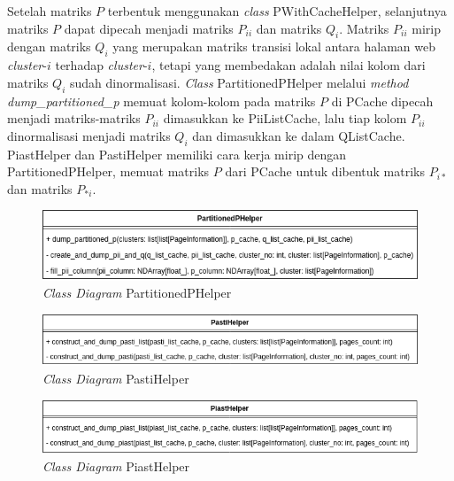 Setelah matriks $P$ terbentuk menggunakan \textit{class} PWithCacheHelper, selanjutnya matriks $P$ dapat dipecah menjadi matriks $P_{ii}$ dan matriks $Q_i$. Matriks $P_{ii}$ mirip dengan matriks $Q_i$ yang merupakan matriks transisi lokal antara halaman web \textit{cluster}-$i$ terhadap \textit{cluster}-$i$, tetapi yang membedakan adalah nilai kolom dari matriks $Q_i$ sudah dinormalisasi. \textit{Class} PartitionedPHelper melalui \textit{method} \textit{dump\_partitioned\_p} memuat kolom-kolom pada matriks $P$ di PCache dipecah menjadi matriks-matriks $P_{ii}$ dimasukkan ke PiiListCache, lalu tiap kolom $P_{ii}$ dinormalisasi menjadi matriks $Q_i$ dan dimasukkan ke dalam QListCache. PiastHelper dan PastiHelper memiliki cara kerja mirip dengan PartitionedPHelper, memuat matriks $P$ dari PCache untuk dibentuk matriks $P_{i*}$ dan matriks $P_{*i}$. 

\begin{figure}[H]
  \centering
  \includegraphics[keepaspectratio, width={\textwidth}]{gambar/partitioned_p_helper_class_diagram}
  \caption{\textit{Class Diagram} PartitionedPHelper}
	\label{gambar:partitioned_p_helper_class_diagram}
\end{figure}

\begin{figure}[H]
  \centering
  \includegraphics[keepaspectratio, width={\textwidth}]{gambar/pasti_helper_class_diagram}
  \caption{\textit{Class Diagram} PastiHelper}
	\label{gambar:pasti_helper_class_diagram}
\end{figure}

\begin{figure}[H]
  \centering
  \includegraphics[keepaspectratio, width={\textwidth}]{gambar/piast_helper_class_diagram}
  \caption{\textit{Class Diagram} PiastHelper}
	\label{gambar:piast_helper_class_diagram}
\end{figure}

